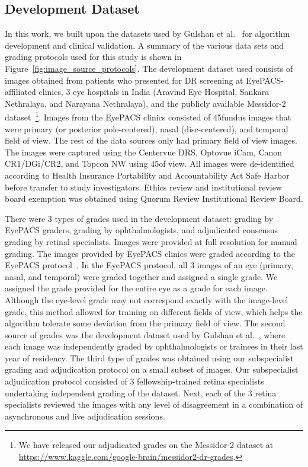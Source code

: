 \documentclass{llncs}
\begin{document}
\subsection{Development Dataset}
In this work, we built upon the datasets used by Gulshan et al.~\cite{gulshan2016development} for algorithm development and clinical validation. A summary of the various data sets and grading protocols used for this study is shown in Figure~\ref{fig:image_source_protocols}. The development dataset used consists of images obtained from patients who presented for DR screening at EyePACS-affiliated clinics, 3 eye hospitals in India (Aravind Eye Hospital, Sankara Nethralaya, and Narayana Nethralaya), and the publicly available Messidor-2 dataset~\cite{decenciere2014feedback,quellec2008optimal}\footnote{We have released our adjudicated grades on the Messidor-2 dataset at \url{https://www.kaggle.com/google-brain/messidor2-dr-grades}.}. Images from the EyePACS clinics consisted of 45\textdegree\retinal fundus images that were primary (or posterior pole-centered), nasal (disc-centered), and temporal field of view. The rest of the data sources only had primary field of view images. The images were captured using the Centervue DRS, Optovue iCam, Canon CR1/DGi/CR2, and Topcon NW using 45\textdegree\fields of view. All images were de-identified according to Health Insurance Portability and Accountability Act Safe Harbor before transfer to study investigators.  Ethics review and institutional review board exemption was obtained using Quorum Review Institutional Review Board.

There were 3 types of grades used in the development dataset: grading by EyePACS graders, grading by ophthalmologists, and adjudicated consensus grading by retinal specialists. Images were provided at full resolution for manual grading. The images provided by EyePACS clinics were graded according to the EyePACS protocol~\cite{eyepacs}. In the EyePACS protocol, all 3 images of an eye (primary, nasal, and temporal) were graded together and assigned a single grade. We assigned the grade provided for the entire eye as a grade for each image. Although the eye-level grade may not correspond exactly with the image-level grade, this method allowed for training on different fields of view, which helps the algorithm tolerate some deviation from the primary field of view.  The second source of grades was the development dataset used by Gulshan et al.~\cite{gulshan2016development}, where each image was independently graded by ophthalmologists or trainees in their last year of residency. The third type of grades was obtained using our subspecialist grading and adjudication protocol on a small subset of images. Our subspecialist adjudication protocol consisted of 3 fellowship-trained retina specialists undertaking independent grading of the dataset. Next, each of the 3 retina specialists reviewed the images with any level of disagreement in a combination of asynchronous and live adjudication sessions.  
\end{document}

